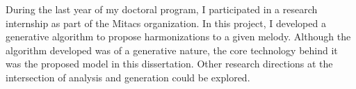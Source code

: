 
During the last year of my doctoral program, I participated
in a research internship as part of the Mitacs
organization.
In this project, I developed a generative algorithm to
propose harmonizations to a given melody. Although the
algorithm developed was of a generative nature, the core
technology behind it was the proposed model in this
dissertation. Other research directions at the intersection
of analysis and generation could be explored.
